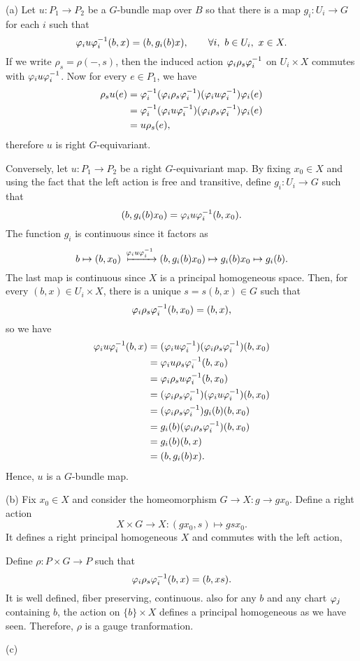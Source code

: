 \documentclass{../../large}
\begin{document}
\begin{pf}
(a)
Let $u:P_1\to P_2$ be a $G$-bundle map over $B$ so that there is a map $g_i:U_i\to G$ for each $i$ such that
\[\varphi_iu\varphi_i^{-1}(b,x)=(b,g_i(b)x),
\qquad\forall i,\ b\in U_i,\ x\in X.\]
If we write $\rho_s=\rho(-,s)$, then the induced action $\varphi_i\rho_s\varphi_i^{-1}$ on $U_i\times X$ commutes with $\varphi_iu\varphi_i^{-1}$.
Now for every $e\in P_1$, we have
\begin{align*}
\rho_su(e)
&=\varphi_i^{-1}(\varphi_i\rho_s\varphi_i^{-1})(\varphi_iu\varphi_i^{-1})\varphi_i(e)\\
&=\varphi_i^{-1}(\varphi_iu\varphi_i^{-1})(\varphi_i\rho_s\varphi_i^{-1})\varphi_i(e)\\
&=u\rho_s(e),
\end{align*}
therefore $u$ is right $G$-equivariant.

Conversely, let $u:P_1\to P_2$ be a right $G$-equivariant map.
By fixing $x_0\in X$ and using the fact that the left action is free and transitive, define $g_i:U_i\to G$ such that
\[(b,g_i(b)x_0)=\varphi_iu\varphi_i^{-1}(b,x_0).\]
The function $g_i$ is continuous since it factors as
\[b\mapsto(b,x_0)\xmapsto{\f_iu\f_i^{-1}}(b,g_i(b)x_0)\mapsto g_i(b)x_0\mapsto g_i(b).\]
The last map is continuous since $X$ is a principal homogeneous space.
Then, for every $(b,x)\in U_i\times X$, there is a unique $s=s(b,x)\in G$ such that
\[\varphi_i\rho_s\varphi_i^{-1}(b,x_0)=(b,x),\]
so we have
\begin{align*}
\varphi_iu\varphi_i^{-1}(b,x)
&=(\varphi_iu\varphi_i^{-1})(\varphi_i\rho_s\varphi_i^{-1})(b,x_0)\\
&=\varphi_iu\rho_s\varphi_i^{-1}(b,x_0)\\
&=\varphi_i\rho_su\varphi_i^{-1}(b,x_0)\\
&=(\varphi_i\rho_s\varphi_i^{-1})(\varphi_iu\varphi_i^{-1})(b,x_0)\\
&=(\varphi_i\rho_s\varphi_i^{-1})g_i(b)(b,x_0)\\
&=g_i(b)(\varphi_i\rho_s\varphi_i^{-1})(b,x_0)\\
&=g_i(b)(b,x)\\
&=(b,g_i(b)x).
\end{align*}
Hence, $u$ is a $G$-bundle map.

(b)
Fix $x_0\in X$ and consider the homeomorphism $G\to X:g\to gx_0$.
Define a right action
\[X\times G\to X:(gx_0,s)\mapsto gsx_0.\]
It defines a right principal homogeneous $X$ and commutes with the left action, 

Define $\rho:P\times G\to P$ such that
\[\varphi_i\rho_s\varphi_i^{-1}(b,x)=(b,xs).\]
It is well defined, fiber preserving, continuous.
also for any $b$ and any chart $\varphi_j$ containing $b$, the action on $\{b\}\times X$ defines a principal homogeneous as we have seen.
Therefore, $\rho$ is a gauge tranformation.

(c)

\end{pf}
\end{document}
